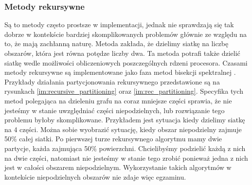 \subsubsection{Metody rekursywne}

Są to metody często prostsze w implementacji, jednak nie sprawdzają się tak dobrze w kontekście bardziej
skomplikowanych problemów głównie ze względu na to, że mają zachłanną naturę.
Metoda \cite{recursive} zakłada, że dzielimy siatkę na liczbę obszarów,
która jest równa potędze liczby dwa. Ta metoda potrafi także dzielić siatkę wedle możliwości obliczeniowych
poszczególnych rdzeni procesora. Czasami metody rekursywne są implementowane jako faza metod
bisekcji spektralnej \cite{10.1137/0611030}. Przykłady działania partycjonowania rekursywnego przedstawione są na rysunkach
\ref{im:recursive_partitioning} oraz \ref{im:rec_partitioning}.
Specyfika tych metod polegająca na dzieleniu grafu na coraz mniejsze
części sprawia, że nie jesteśmy w stanie uwzględniać części niepodzielnych, lub rozwiązanie tego problemu byłoby skomplikowane.
Przykładem jest sytuacja kiedy dzielimy siatkę na 4 części. Można sobie wyobrazić sytuację, kiedy obszar niepodzielny zajmuje 50\% całej siatki.
Po pierwszej turze rekursywnego algorytmu mamy dwie partycje, każda zajmująca 50\% powierzchni. Chcielibyśmy podzielić
każdą z nich na dwie części, natomiast nie jesteśmy w stanie tego zrobić ponieważ jedna z nich jest w całości obszarem
niepodzielnym. Wykorzystanie takich algorytmów w kontekście niepodzielnych obszarów nie zdaje więc egzaminu.



